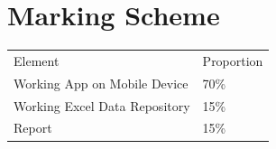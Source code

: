 \section*{Marking Scheme}
\begin{table}[h!]
	\begin{center}
		\begin{tabular}{p{8cm}  p{2cm} }
			\toprule
			\large{Element} & \large{Proportion} \\ 
			\cmidrule(r){1-1}\cmidrule(lr){2-2}
			Working App on Mobile Device& 70\%\\
			Working Excel Data Repository & 15\%\\
			Report & 15\%     
			\\ \bottomrule
		\end{tabular}
		\label{tbl:markSchemeAsmt3}
	\end{center}
\end{table}


